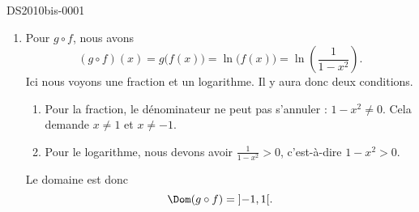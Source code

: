 \begin{corrige}{DS2010bis-0001}
\begin{enumerate}
\begin{enumerate}
				\item
					Pour $g\circ f$, nous avons
					\begin{equation}
						(g\circ f)(x)=g\big( f(x) \big)=\ln\big( f(x) \big)=\ln\left( \frac{1}{ 1-x^2 } \right).
					\end{equation}
					Ici nous voyons une fraction et un logarithme. Il y aura donc deux conditions.
					\begin{enumerate}
						\item
							Pour la fraction, le dénominateur ne peut pas s'annuler : $1-x^2\neq 0$. Cela demande $x\neq 1$ et $x\neq -1$.
						\item
							Pour le logarithme, nous devons avoir $\frac{1}{ 1-x^2 }>0$, c'est-à-dire $1-x^2>0$. 
					\end{enumerate}
					Le domaine est donc
					\begin{equation}
						\Dom(g\circ f)=\mathopen] -1 , 1 \mathclose[.
					\end{equation}
			\end{enumerate}
			
	\end{enumerate}

\end{corrige}
